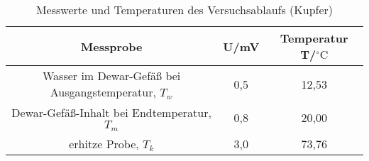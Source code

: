 \begin{table}[h]
	\begin{center}
		\begin{tabular}{ccc}
			Messprobe & U/mV & Temperatur T/$^{\circ}\mathrm{C}$\\ \hline
			Wasser im Dewar-Gefäß bei Ausgangstemperatur, $T_w$& 0,5 & 12,53\\
			Dewar-Gefäß-Inhalt bei Endtemperatur, $T_m$&0,8&20,00\\
			erhitze Probe, $T_k$&3,0&73,76
		\end{tabular}
		\caption{Messwerte und Temperaturen des Versuchsablaufs (Kupfer)}
		\label{tabkupfer1}
	\end{center}
\end{table}